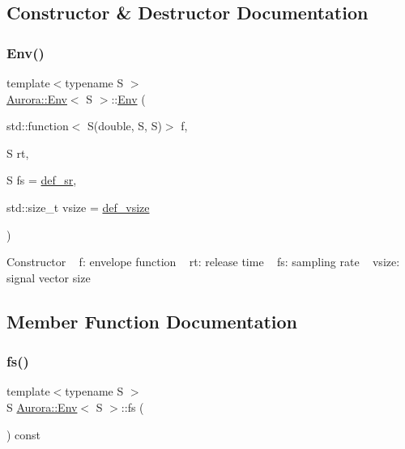 \subsection{Constructor \& Destructor Documentation}
\mbox{\label{class_aurora_1_1_env_a2ea7f7db3541bd36853d66423ee74b78}} 
\subsubsection{\texorpdfstring{Env()}{Env()}}
{\footnotesize\ttfamily template$<$typename S $>$ \\
\hyperlink{class_aurora_1_1_env}{Aurora\+::\+Env}$<$ S $>$\+::\hyperlink{class_aurora_1_1_env}{Env} (\begin{DoxyParamCaption}\item[{std\+::function$<$ S(double, S, S)$>$}]{f,  }\item[{S}]{rt,  }\item[{S}]{fs = {\ttfamily \hyperlink{namespace_aurora_ad49263d809bea98dd422e95bc91bc03e}{def\+\_\+sr}},  }\item[{std\+::size\+\_\+t}]{vsize = {\ttfamily \hyperlink{namespace_aurora_afaaddf667a06e7ce23c667a8b7295263}{def\+\_\+vsize}} }\end{DoxyParamCaption})\hspace{0.3cm}{\ttfamily [inline]}}

Constructor ~\newline
f\+: envelope function ~\newline
rt\+: release time ~\newline
fs\+: sampling rate ~\newline
vsize\+: signal vector size 

\subsection{Member Function Documentation}
\mbox{\label{class_aurora_1_1_env_a82aa0806fae0fac3e527f30b4c2fccc1}} 
\subsubsection{\texorpdfstring{fs()}{fs()}}
{\footnotesize\ttfamily template$<$typename S $>$ \\
S \hyperlink{class_aurora_1_1_env}{Aurora\+::\+Env}$<$ S $>$\+::fs (\begin{DoxyParamCaption}{ }\end{DoxyParamCaption}) const\hspace{0.3cm}{\ttfamily [inline]}}

